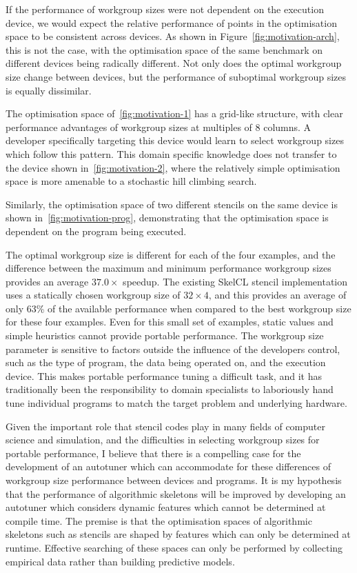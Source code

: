 If the performance of workgroup sizes were not dependent on the
execution device, we would expect the relative performance of points
in the optimisation space to be consistent across devices. As shown in
Figure~\ref{fig:motivation-arch}, this is not the case, with the
optimisation space of the same benchmark on different devices being
radically different. Not only does the optimal workgroup size change
between devices, but the performance of suboptimal workgroup sizes is
equally dissimilar.

The optimisation space of~\ref{fig:motivation-1} has a grid-like
structure, with clear performance advantages of workgroup sizes at
multiples of 8 columns. A developer specifically targeting this device
would learn to select workgroup sizes which follow this pattern. This
domain specific knowledge does not transfer to the device shown
in~\ref{fig:motivation-2}, where the relatively simple optimisation
space is more amenable to a stochastic hill climbing search.

Similarly, the optimisation space of two different stencils on the
same device is shown in~\ref{fig:motivation-prog}, demonstrating that
the optimisation space is dependent on the program being executed.

The optimal workgroup size is different for each of the four examples,
and the difference between the maximum and minimum performance
workgroup sizes provides an average $37.0\times$ speedup. The existing
SkelCL stencil implementation uses a statically chosen workgroup size
of $32\times4$, and this provides an average of only 63\% of the
available performance when compared to the best workgroup size for
these four examples. Even for this small set of examples, static
values and simple heuristics cannot provide portable performance. The
workgroup size parameter is sensitive to factors outside the influence
of the developers control, such as the type of program, the data being
operated on, and the execution device. This makes portable performance
tuning a difficult task, and it has traditionally been the
responsibility to domain specialists to laboriously hand tune
individual programs to match the target problem and underlying
hardware.

Given the important role that stencil codes play in many fields of
computer science and simulation, and the difficulties in selecting
workgroup sizes for portable performance, I believe that there is a
compelling case for the development of an autotuner which can
accommodate for these differences of workgroup size performance
between devices and programs. It is my hypothesis that the performance
of algorithmic skeletons will be improved by developing an autotuner
which considers dynamic features which cannot be determined at compile
time. The premise is that the optimisation spaces of algorithmic
skeletons such as stencils are shaped by features which can only be
determined at runtime. Effective searching of these spaces can only be
performed by collecting empirical data rather than building predictive
models.

